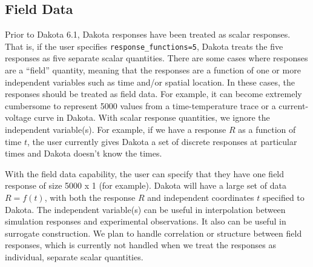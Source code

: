 \subsection{Field Data}
Prior to Dakota 6.1, Dakota responses have been treated as 
scalar responses.  That is, if the user specifies 
\texttt{response\_functions=5}, Dakota treats the five responses as five separate scalar quantities.  There are some cases where responses are a ``field'' quantity, meaning that the responses are a function of one or more independent variables such as time and/or spatial location.  In these cases, the responses should be treated as field data.  For example, it can become 
extremely cumbersome to represent 5000 values from a 
time-temperature trace or a current-voltage curve in Dakota.  
With scalar response quantities, we ignore the independent variable(s).  
For example, if we have a response $R$ as a function of time $t$, 
the user currently gives Dakota a set of discrete responses at particular times and Dakota doesn't know the times.  

With the field data capability, the user can specify that 
they have one field response of size 5000 x 1 (for example). 
Dakota will have a large set 
of data $R=f(t)$, with both the response $R$ and independent 
coordinates $t$ specified to Dakota.  
The independent variable(s) can be useful in interpolation between simulation responses and experimental observations.  
It also can be useful in surrogate construction.  
We plan to handle correlation or structure between 
field responses, which is currently not handled when 
we treat the responses as individual, separate scalar 
quantities. 

